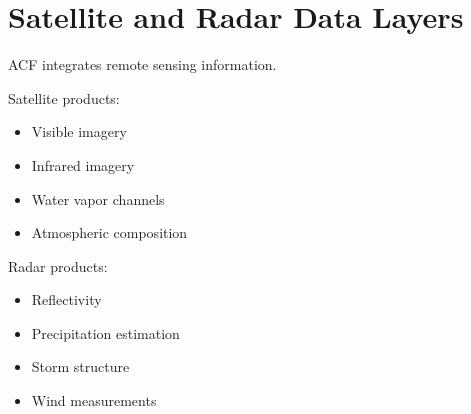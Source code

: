 \section{Satellite and Radar Data Layers}


ACF integrates remote sensing information.



Satellite products:


\begin{itemize}

\item Visible imagery

\item Infrared imagery

\item Water vapor channels

\item Atmospheric composition

\end{itemize}



Radar products:


\begin{itemize}

\item Reflectivity

\item Precipitation estimation

\item Storm structure

\item Wind measurements

\end{itemize}

